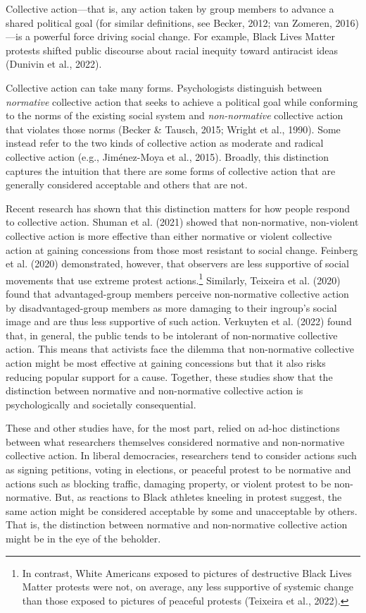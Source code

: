 \documentclass[12pt, letterpaper]{article}
\begin{document}
Collective action---that is, any action taken by group members to
advance a shared political goal (for similar definitions, see Becker,
2012; van Zomeren, 2016)---is a powerful force driving social change.
For example, Black Lives Matter protests shifted public discourse about
racial inequity toward antiracist ideas (Dunivin et al., 2022).

Collective action can take many forms. Psychologists distinguish between
\emph{normative} collective action that seeks to achieve a political
goal while conforming to the norms of the existing social system and
\emph{non-normative} collective action that violates those norms (Becker
\& Tausch, 2015; Wright et al., 1990). Some instead refer to the two
kinds of collective action as moderate and radical collective action
(e.g., Jiménez-Moya et al., 2015). Broadly, this distinction captures
the intuition that there are some forms of collective action that are
generally considered acceptable and others that are not.

Recent research has shown that this distinction matters for how people
respond to collective action. Shuman et al. (2021) showed that
non-normative, non-violent collective action is more effective than
either normative or violent collective action at gaining concessions
from those most resistant to social change. Feinberg et al. (2020)
demonstrated, however, that observers are less supportive of social
movements that use extreme protest actions.\footnote{In contrast, White
  Americans exposed to pictures of destructive Black Lives Matter
  protests were not, on average, any less supportive of systemic change
  than those exposed to pictures of peaceful protests (Teixeira et al.,
  2022).} Similarly, Teixeira et al. (2020) found that advantaged-group
members perceive non-normative collective action by disadvantaged-group
members as more damaging to their ingroup's social image and are thus
less supportive of such action. Verkuyten et al. (2022) found that, in
general, the public tends to be intolerant of non-normative collective
action. This means that activists face the dilemma that non-normative
collective action might be most effective at gaining concessions but
that it also risks reducing popular support for a cause. Together, these
studies show that the distinction between normative and non-normative
collective action is psychologically and societally consequential.

These and other studies have, for the most part, relied on ad-hoc
distinctions between what researchers themselves considered normative
and non-normative collective action. In liberal democracies, researchers
tend to consider actions such as signing petitions, voting in elections,
or peaceful protest to be normative and actions such as blocking
traffic, damaging property, or violent protest to be non-normative. But,
as reactions to Black athletes kneeling in protest suggest, the same
action might be considered acceptable by some and unacceptable by
others. That is, the distinction between normative and non-normative
collective action might be in the eye of the beholder.
\end{document}
